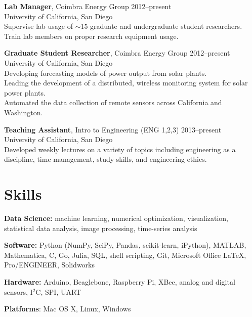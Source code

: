 \documentclass[]{res}
\begin{document}
\begin{resume}
\textbf{Lab Manager}, Coimbra Energy Group \hfill 2012--present \\
University of California, San Diego \\
Supervise lab usage of $\sim$15 graduate and undergraduate student researchers. \\
Train lab members on proper research equipment usage.

\textbf{Graduate Student Researcher}, Coimbra Energy Group \hfill 2012--present \\
University of California, San Diego \\
Developing forecasting models of power output from solar plants. \\
Leading the development of a distributed, wireless monitoring system for solar power plants. \\
Automated the data collection of remote sensors across California and Washington.

\textbf{Teaching Assistant}, Intro to Engineering (ENG 1,2,3) \hfill 2013--present \\
University of California, San Diego \\
Developed weekly lectures on a variety of topics including engineering as a
discipline, time management, study skills, and engineering ethics.



\section{Skills}
\vspace{0.1in}

\textbf{Data Science:} machine learning, numerical optimization, visualization,
statistical data analysis, image processing, time-series analysis

\textbf{Software:} Python (NumPy, SciPy, Pandas, scikit-learn, iPython),
MATLAB, Mathematica, C, Go, Julia, SQL, shell scripting, Git, Microsoft Office
LaTeX, Pro/ENGINEER, Solidworks

\textbf{Hardware:} Arduino, Beaglebone, Raspberry Pi, XBee, analog and digital
sensors, I$^2$C, SPI, UART

\textbf{Platforms}: Mac OS X, Linux, Windows



\end{resume}
\end{document}
